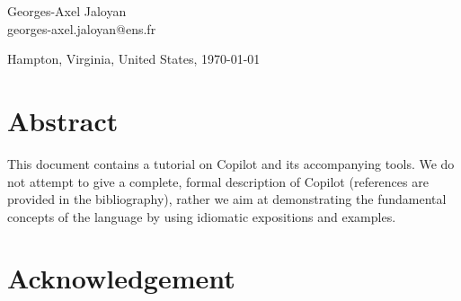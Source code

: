 \documentclass[12pt]{article}
\theoremstyle{example}
\begin{document}
\begin{center}
\begin{minipage}{0.3\textwidth}
\large
\begin{center}
Georges-Axel Jaloyan \\
\small{
georges-axel.jaloyan@ens.fr\\
}
\end{center}
\end{minipage}

\vspace{1cm}

{\large
Hampton, Virginia, United States, \today
}


\let\thefootnote\relax{}

\end{center}

\vspace{0.25cm}

\section*{Abstract}

{
\small
This document contains a tutorial on Copilot and its accompanying tools.
We do not attempt to give a complete, formal description of Copilot
(references are provided in the bibliography), rather we aim at
demonstrating the fundamental concepts of the language by using idiomatic
expositions and examples.
}

{
\small
\setcounter{tocdepth}{2}
\tableofcontents
}

\newpage
{}
\section*{Acknowledgement}
\end{document}
